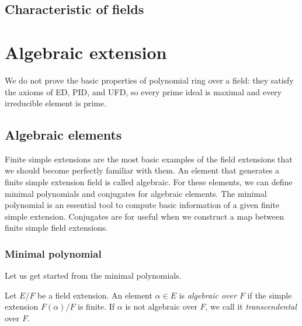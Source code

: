\documentclass{../exp}
\begin{document}
\subsection{Characteristic of fields}











\section{Algebraic extension}

We do not prove the basic properties of polynomial ring over a field: they satisfy the axioms of ED, PID, and UFD, so every prime ideal is maximal and every irreducible element is prime.

\subsection{Algebraic elements}
Finite simple extensions are the most basic examples of the field extensions that we should become perfectly familiar with them.
An element that generates a finite simple extension field is called algebraic.
For these elements, we can define minimal polynomials and conjugates for algebraic elements.
The minimal polynomial is an essential tool to compute basic information of a given finite simple extension.
Conjugates are for useful when we construct a map between finite simple field extensions.

\subsubsection{Minimal polynomial}
Let us get started from the minimal polynomials.

\begin{defn}
Let $E/F$ be a field extension.
An element $\alpha\in E$ is \emph{algebraic over $F$} if the simple extension $F(\alpha)/F$ is finite.
If $\alpha$ is not algebraic over $F$, we call it \emph{transcendental} over $F$.
\end{defn}
\end{document}
